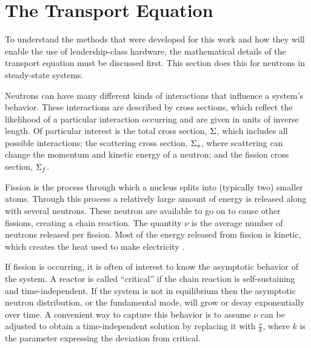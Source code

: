 \section{The Transport Equation}
To understand the methods that were developed for this work and how they will enable the use of leadership-class hardware, the mathematical details of the transport equation must be discussed first. This section does this for neutrons in steady-state systems. 

Neutrons can have many different kinds of interactions that influence a system's behavior. These interactions are described by cross sections, which reflect the likelihood of a particular interaction occurring and are given in units of inverse length. Of particular interest is the total cross section, $\Sigma$, which includes all possible interactions; the scattering cross section, $\Sigma_{s}$, where scattering can change the momentum and kinetic energy of a neutron; and the fission cross section, $\Sigma_{f}$.   

Fission is the process through which a nucleus splits into (typically two) smaller atoms. Through this process a relatively large amount of energy is released along with several neutrons. These neutron are available to go on to cause other fissions, creating a chain reaction. The quantity $\nu$ is the average number of neutrons released per fission. Most of the energy released from fission is kinetic, which creates the heat used to make electricity \cite{Lewis1993}.  

If fission is occurring, it is often of interest to know the asymptotic behavior of the system. A reactor is called ``critical'' if the chain reaction is self-sustaining and time-independent. If the system is not in equilibrium then the asymptotic neutron distribution, or the fundamental mode, will grow or decay exponentially over time. A convenient way to capture this behavior is to assume $\nu$ can be adjusted to obtain a time-independent solution by replacing it with $\frac{\nu}{k}$, where $k$ is the parameter expressing the deviation from critical. 

